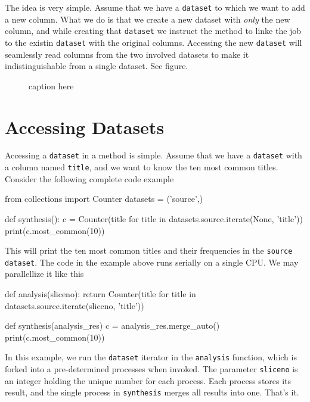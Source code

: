 \documentclass[a4paper]{article}
\begin{document}
The idea is very simple.  Assume that we have a \texttt{dataset} to
which we want to add a new column.  What we do is that we create a new
dataset with \textsl{only} the new column, and while creating that
\texttt{dataset} we instruct the method to linke the job to the
existin \texttt{dataset} with the original columns.  Accessing the new
\texttt{dataset} will seamlessly read columns from the two involved
datasets to make it indistinguishable from a single dataset.  See
figure.



\begin{figure}[h!]
  \begin{center}
    
    \caption{caption here}
    \label{fig:dep_dataset_csvimport_chain}
  \end{center}
\end{figure}








\section{Accessing Datasets}
Accessing a \texttt{dataset} in a method is simple.  Assume that we
have a \texttt{dataset} with a column named \texttt{title}, and we
want to know the ten most common titles.  Consider the following
complete code example
\begin{python}
from collections import Counter
datasets = ('source',)

def synthesis():
    c = Counter(title for title in datasets.source.iterate(None, 'title'))
    print(c.most_common(10))
\end{python}

\noindent This will print the ten most common titles and their
frequencies in the \texttt{source} \texttt{dataset}.  The code in the
example above runs serially on a single CPU.  We may parallellize it
like this
\begin{python}
def analysis(sliceno):
    return Counter(title for title in datasets.source.iterate(sliceno, 'title'))

def synthesis(analysis_res)
    c = analysis_res.merge_auto()
    print(c.most_common(10))
\end{python}

\noindent In this example, we run the \texttt{dataset} iterator in the
\texttt{analysis} function, which is forked into a pre-determined
processes when invoked.  The parameter \texttt{sliceno} is an integer
holding the unique number for each process.  Each process stores its
result, and the single process in \texttt{synthesis} merges all
results into one.  That's it.
\end{document}
